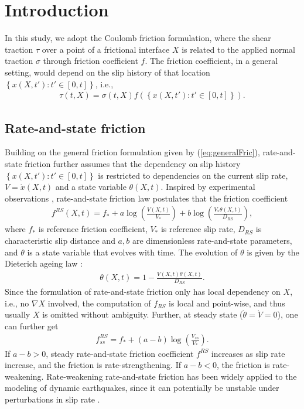 \section{Introduction}
\label{sec:introduction}

In this study, 
we adopt the Coulomb friction formulation, 
where the shear traction $\tau$ over a point of a frictional interface $X$ is related to the applied normal traction $\sigma$ through friction coefficient $f$. 
The friction coefficient, 
in a general setting, 
would depend on the slip history of that location $\left\{x(X, t') : t' \in [0, t]\right\}$, i.e., 
\begin{align}
    \tau(t, X) = \sigma(t, X) f\left(\left\{x(X, t') : t' \in [0, t]\right\}\right) \label{eq:generalFric}. 
\end{align}

\subsection{Rate-and-state friction}
Building on the general friction formulation given by (\ref{eq:generalFric}), 
rate-and-state friction further assumes that the dependency on slip history $\left\{x(X, t') : t' \in [0, t]\right\}$ is restricted to dependencies on the current slip rate, 
$V = \dot{x}(X, t)$ and a state variable $\theta(X, t)$. 
Inspired by experimental observations \citep{dieterich_modeling_1979, marone_laboratory-derived_1998, ruina_slip_1983}, 
rate-and-state friction law postulates that the friction coefficient 
\begin{align}
    f^{RS}(X, t) = f_* + a \log\left(\frac{V(X, t)}{V_*}\right) + b \log\left(\frac{V_* \theta(X, t)} {D_{RS}}\right) \label{eq:fRS}, 
\end{align}
where $f_*$ is reference friction coefficient, 
$V_*$ is reference slip rate, 
$D_{RS}$ is characteristic slip distance and $a, b$ are dimensionless rate-and-state parameters, 
and $\theta$ is a state variable that evolves with time. 
The evolution of $\theta$ is given by the Dieterich ageing law \citep{dieterich_modeling_1979, ruina_slip_1983}:
\begin{align}
    \theta(X, t) = 1 - \frac{V(X, t) \theta(X, t)}{D_{RS}} \label{eq:AgeingLaw}. 
\end{align}
Since the formulation of rate-and-state friction only has local dependency on $X$, 
i.e., no $\nabla X$ involved, 
the computation of $f_{RS}$ is local and point-wise, 
and thus usually $X$ is omitted without ambiguity. 
Further, 
at steady state ($\dot{\theta} = \dot{V} = 0$), 
one can further get 
\begin{align}
    f_{ss}^{RS} = f_* + (a - b) \log \left(\frac{V_{ss}}{V_*}\right) \label{eq:fRSss}. 
\end{align}
If $a - b > 0$, 
steady rate-and-state friction coefficient $f^{RS}$ increases as slip rate increase, 
and the friction is rate-strengthening. 
If $a - b < 0$, 
the friction is rate-weakening. 
Rate-weakening rate-and-state friction has been widely applied to the modeling of dynamic earthquakes, 
since it can potentially be unstable under perturbations in slip rate \citep{dieterich_modeling_1979, 
 marone_laboratory-derived_1998, ruina_slip_1983,rice_stability_1983, scholz_2019}. 

